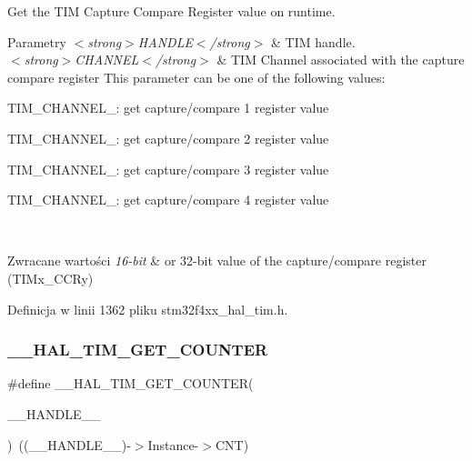 Get the T\+IM Capture Compare Register value on runtime. 


\begin{DoxyParams}{Parametry}
{\em $<$strong$>$\+H\+A\+N\+D\+L\+E$<$/strong$>$} & T\+IM handle. \\
\hline
{\em $<$strong$>$\+C\+H\+A\+N\+N\+E\+L$<$/strong$>$} & T\+IM Channel associated with the capture compare register This parameter can be one of the following values\+: \begin{DoxyItemize}
\item T\+I\+M\+\_\+\+C\+H\+A\+N\+N\+E\+L\+\_\+: get capture/compare 1 register value \item T\+I\+M\+\_\+\+C\+H\+A\+N\+N\+E\+L\+\_\+: get capture/compare 2 register value \item T\+I\+M\+\_\+\+C\+H\+A\+N\+N\+E\+L\+\_\+: get capture/compare 3 register value \item T\+I\+M\+\_\+\+C\+H\+A\+N\+N\+E\+L\+\_\+: get capture/compare 4 register value \end{DoxyItemize}
\\
\hline
\end{DoxyParams}

\begin{DoxyRetVals}{Zwracane wartości}
{\em 16-\/bit} & or 32-\/bit value of the capture/compare register (T\+I\+Mx\+\_\+\+C\+C\+Ry) \\
\hline
\end{DoxyRetVals}


Definicja w linii 1362 pliku stm32f4xx\+\_\+hal\+\_\+tim.\+h.

\mbox{\label{group___t_i_m___exported___macros_gaf1af08014b9d06efbbb091d58d47c8ba}} 
\subsubsection{\texorpdfstring{\+\_\+\+\_\+\+H\+A\+L\+\_\+\+T\+I\+M\+\_\+\+G\+E\+T\+\_\+\+C\+O\+U\+N\+T\+ER}{\_\_HAL\_TIM\_GET\_COUNTER}}
{\footnotesize\ttfamily \#define \+\_\+\+\_\+\+H\+A\+L\+\_\+\+T\+I\+M\+\_\+\+G\+E\+T\+\_\+\+C\+O\+U\+N\+T\+ER(\begin{DoxyParamCaption}\item[{}]{\+\_\+\+\_\+\+H\+A\+N\+D\+L\+E\+\_\+\+\_\+ }\end{DoxyParamCaption})~((\+\_\+\+\_\+\+H\+A\+N\+D\+L\+E\+\_\+\+\_\+)-\/$>$Instance-\/$>$C\+NT)}



